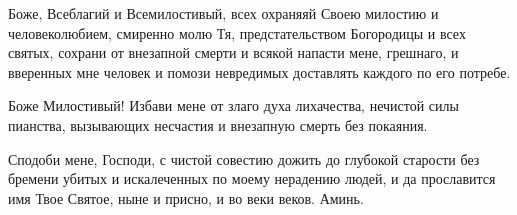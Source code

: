 \mychapterending


\begin{mymulticols}



Боже, Всеблагий и Всемилостивый, всех охраняяй Своею милостию и человеколюбием, смиренно молю Тя, предстательством Богородицы и всех святых, сохрани от внезапной смерти и всякой напасти мене, грешнаго, и вверенных мне человек и помози невредимых доставлять каждого по его потребе.


Боже Милостивый! Избави мене от злаго духа лихачества, нечистой силы пианства, вызывающих несчастия и внезапную смерть без покаяния.


Сподоби мене, Господи, с чистой совестию дожить до глубокой старости без бремени убитых и искалеченных по моему нерадению людей, и да прославится имя Твое Святое, ныне и присно, и во веки веков. Аминь.

\end{mymulticols}

\mychapterending


